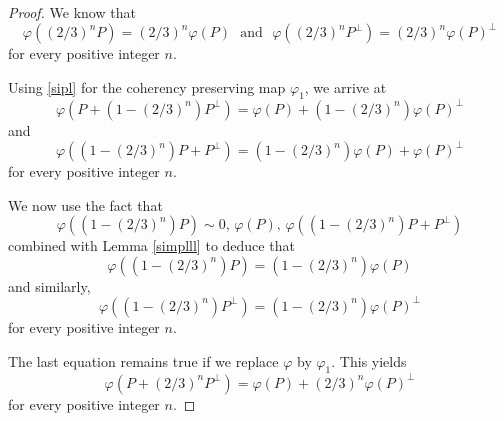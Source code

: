 \documentclass[10pt]{amsart}
\theoremstyle{definition}
\theoremstyle{remark}
\numberwithin{subsection}{section}
\numberwithin{equation}{section}
\begin{document}
\begin{proof}
We know that
\begin{equation}\label{sipl}
\varphi ( (2/3)^n P ) = (2/3)^n \varphi (P) \ \ \ \text{and}  \ \ \ \varphi ( (2/3)^n P^\perp ) = (2/3)^n \varphi(P)^\perp
\end{equation}
for every positive integer $n$. 

Using \eqref{sipl} for the coherency preserving map $\varphi_1$, we arrive at
\[
\varphi ( P + (1-(2/3)^n ) P^\perp ) = \varphi (P) + (1-(2/3)^n) \varphi (P)^\perp 
\]
and 
\[
\varphi ( (1 -(2/3)^n ) P + P^\perp ) = (1 - (2/3)^n ) \varphi (P) + \varphi(P)^\perp
\]
for every positive integer $n$. 

We now use the fact that 
\[
\varphi ( (1-(2/3)^n ) P ) \sim 0,\, \varphi (P),\, \varphi ( (1 -(2/3)^n ) P + P^\perp )
\]
combined with Lemma \ref{simplll} to deduce that
\[
\varphi ( (1-(2/3)^n ) P ) = (1-(2/3)^n) \varphi ( P ) 
\]
and similarly, 
\[
\varphi ( (1 - (2/3)^n ) P^\perp ) = (1 - (2/3)^n ) \varphi(P)^\perp
\]
for every positive integer $n$. 

The last equation remains true if we replace $\varphi$ by $\varphi_1$.  This yields
\[
\varphi ( P +(2/3)^n  P^\perp ) = \varphi (P) + (2/3)^n \varphi (P)^\perp 
\]
for every positive integer $n$. 
\end{proof}
\end{document}
